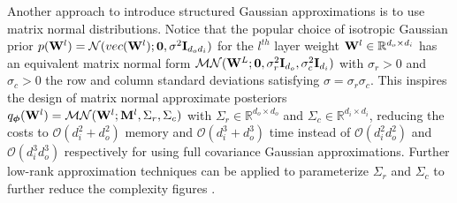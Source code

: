 Another approach to introduce structured Gaussian approximations is to use matrix normal distributions. Notice that the popular choice of isotropic Gaussian prior $p(\mathbf{W}^l) = \mathcal{N}(vec(\mathbf{W}^l); \bm{0}, \sigma^2 \mathbf{I}_{d_o d_i})$ for the $l^{th}$ layer weight $\mathbf{W}^l \in \mathbb{R}^{d_o \times d_i}$ has an equivalent matrix normal form $\mathcal{MN}(\mathbf{W}^L; \bm{0}, \sigma_r^2\mathbf{I}_{d_o}, \sigma_c^2 \mathbf{I}_{d_i})$ with $\sigma_r > 0$ and $\sigma_c > 0$ the row and column standard deviations satisfying $\sigma = \sigma_r \sigma_c$. This inspires the design of matrix normal approximate posteriors $q_{\bm{\phi}}(\mathbf{W}^l) = \mathcal{MN}(\mathbf{W}^l; \mathbf{M}^l, \Sigma_r, \Sigma_c)$ with $\Sigma_r \in \mathbb{R}^{d_o \times d_o}$ and $\Sigma_c \in \mathbb{R}^{d_i \times d_i}$, reducing the costs to $\mathcal{O}(d_i^2 + d_o^2)$ memory and $\mathcal{O}(d_i^3 + d_o^3)$ time instead of $\mathcal{O}(d_i^2 d_o^2)$ and $\mathcal{O}(d_i^3 d_o^3)$ respectively for using full covariance Gaussian approximations. Further low-rank approximation techniques can be applied to parameterize $\Sigma_r$ and $\Sigma_c$ to further reduce the complexity figures \citep{louizos2017multiplicative,ritter2021sparse}.

